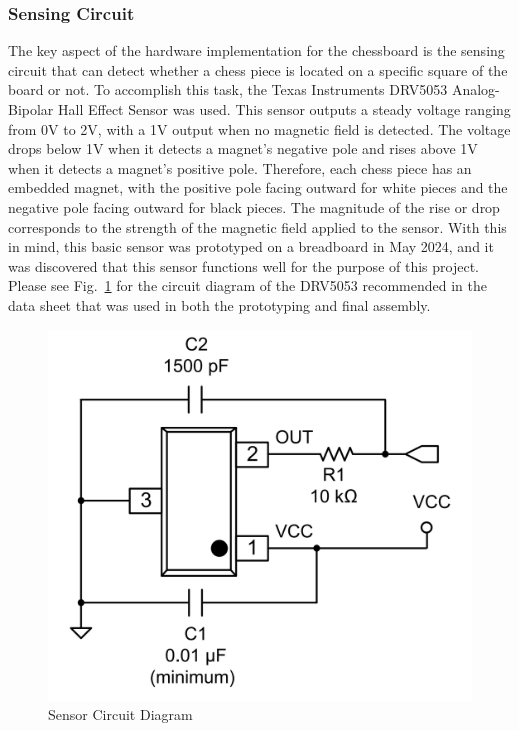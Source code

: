 \documentclass[11pt,journal]{IEEEtran}
\begin{document}
\subsubsection{Sensing Circuit}
The key aspect of the hardware implementation for the chessboard is the sensing circuit that can detect whether a chess piece is located on a specific square of the board or not. To accomplish this task, the Texas Instruments DRV5053 Analog-Bipolar Hall Effect Sensor was used. This sensor outputs a steady voltage ranging from 0V to 2V, with a 1V output when no magnetic field is detected. The voltage drops below 1V when it detects a magnet's negative pole and rises above 1V when it detects a magnet's positive pole. Therefore, each chess piece has an embedded magnet, with the positive pole facing outward for white pieces and the negative pole facing outward for black pieces. The magnitude of the rise or drop corresponds to the strength of the magnetic field applied to the sensor. With this in mind, this basic sensor was prototyped on a breadboard in May 2024, and it was discovered that this sensor functions well for the purpose of this project. Please see Fig.~\ref{sensorcircuit} for the circuit diagram of the DRV5053 recommended in the data sheet that was used in both the prototyping and final assembly.
\begin{figure}[ht]
  \includegraphics[width=\linewidth]{SensorCircuit.png}
  \caption{Sensor Circuit Diagram}
  \label{sensorcircuit}
\end{figure}
\end{document}
